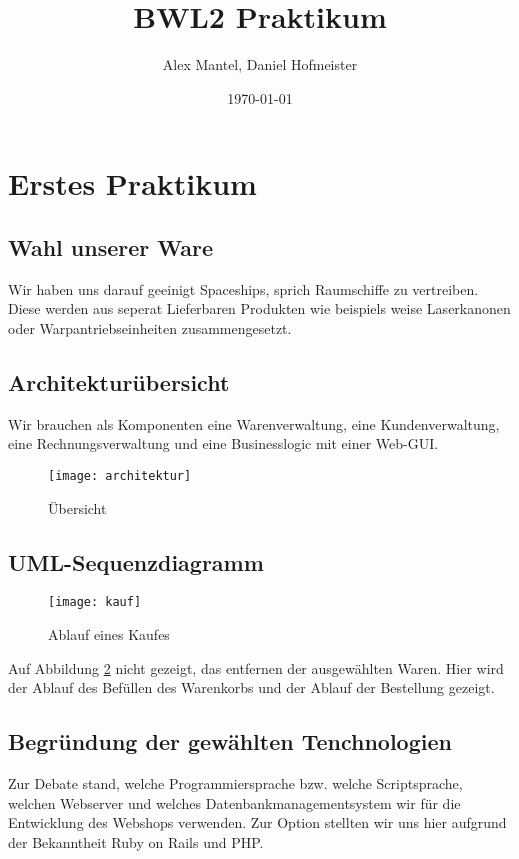 \documentclass[pdftex,10pt,a4paper]{article}
\begin{document}
\title{BWL2 Praktikum}
\author{Alex Mantel, Daniel Hofmeister}
\date{\today}
\maketitle
\newpage

\tableofcontents
\newpage

\section{Erstes Praktikum}

\subsection{Wahl unserer Ware}
Wir haben uns darauf geeinigt Spaceships, sprich Raumschiffe zu vertreiben. Diese werden aus seperat Lieferbaren Produkten wie beispiels weise Laserkanonen oder Warpantriebseinheiten zusammengesetzt. 

\subsection{Architektur\"ubersicht}
Wir brauchen als Komponenten eine Warenverwaltung, eine Kundenverwaltung, eine Rechnungsverwaltung und eine Businesslogic mit einer Web-GUI.

\begin{figure}[h]
  \caption{\"Ubersicht}
  \label{fig:archi}
  \texttt{[image: architektur]}
\end{figure}

\subsection{UML-Sequenzdiagramm}
\begin{figure}[h]
	\caption{Ablauf eines Kaufes}
	\label{fig:kauf}
	\texttt{[image: kauf]}
\end{figure}				
Auf Abbildung \ref{fig:kauf} nicht gezeigt, das entfernen der ausgew\"ahlten Waren. Hier wird der Ablauf des Bef\"ullen des Warenkorbs und der Ablauf der Bestellung gezeigt.

\subsection{Begr\"undung der gew\"ahlten Tenchnologien}
Zur Debate stand, welche Programmiersprache bzw. welche Scriptsprache, welchen Webserver und welches Datenbankmanagementsystem wir f\"ur die Entwicklung des Webshops verwenden. Zur Option stellten wir uns hier aufgrund der Bekanntheit Ruby on Rails und PHP.
\end{document}
